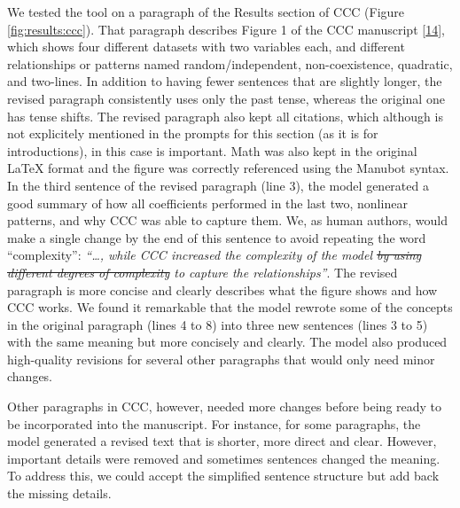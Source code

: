 \documentclass[
]{article}
\begin{document}
We tested the tool on a paragraph of the Results section of CCC (Figure \ref{fig:results:ccc}).
That paragraph describes Figure 1 of the CCC manuscript {[}\protect\hyperlink{ref-eirYTTyk}{14}{]}, which shows four different datasets with two variables each, and different relationships or patterns named random/independent, non-coexistence, quadratic, and two-lines.
In addition to having fewer sentences that are slightly longer, the revised paragraph consistently uses only the past tense, whereas the original one has tense shifts.
The revised paragraph also kept all citations, which although is not explicitely mentioned in the prompts for this section (as it is for introductions), in this case is important.
Math was also kept in the original LaTeX format and the figure was correctly referenced using the Manubot syntax.
In the third sentence of the revised paragraph (line 3), the model generated a good summary of how all coefficients performed in the last two, nonlinear patterns, and why CCC was able to capture them.
We, as human authors, would make a single change by the end of this sentence to avoid repeating the word ``complexity'': \emph{``\ldots, while CCC increased the complexity of the model \sout{by using different degrees of complexity} to capture the relationships''}.
The revised paragraph is more concise and clearly describes what the figure shows and how CCC works.
We found it remarkable that the model rewrote some of the concepts in the original paragraph (lines 4 to 8) into three new sentences (lines 3 to 5) with the same meaning but more concisely and clearly.
The model also produced high-quality revisions for several other paragraphs that would only need minor changes.

Other paragraphs in CCC, however, needed more changes before being ready to be incorporated into the manuscript.
For instance, for some paragraphs, the model generated a revised text that is shorter, more direct and clear.
However, important details were removed and sometimes sentences changed the meaning.
To address this, we could accept the simplified sentence structure but add back the missing details.

% 
\end{document}
